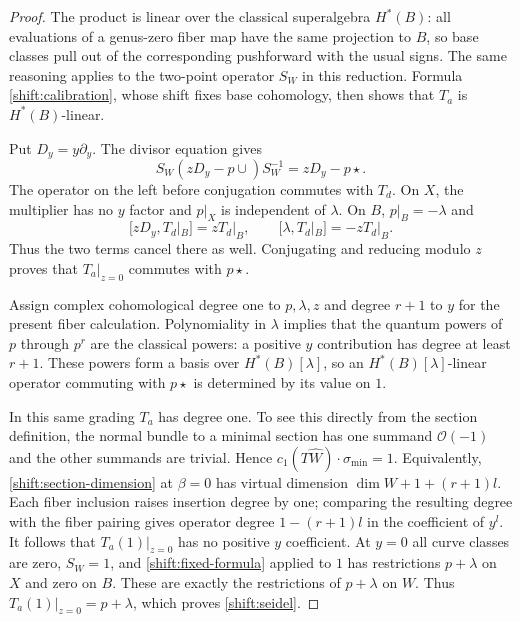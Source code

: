 \begin{proof}
The product is linear over the classical superalgebra $H^*(B)$:
all evaluations of a genus-zero fiber map have the same projection
to $B$, so base classes pull out of the corresponding pushforward
with the usual signs.  The same reasoning applies to the two-point
operator $S_W$ in this reduction.  Formula
\eqref{shift:calibration}, whose shift fixes base cohomology, then
shows that $T_a$ is $H^*(B)$-linear.

Put $D_y=y\partial_y$.  The divisor equation gives
\[
 S_W(zD_y-p\cup)S_W^{-1}=zD_y-p\star.
\]
The operator on the left before conjugation commutes with $T_d$.
On $X$, the multiplier has no $y$ factor and $p|_X$ is independent
of $\lambda$.  On $B$, $p|_B=-\lambda$ and
\[
 [zD_y,T_d|_B]=zT_d|_B,
 \qquad [\lambda,T_d|_B]=-zT_d|_B.
\]
Thus the two terms cancel there as well.  Conjugating and reducing
modulo $z$ proves that $T_a|_{z=0}$ commutes with $p\star$.

Assign complex cohomological degree one to $p,\lambda,z$ and
degree $r+1$ to $y$ for the present fiber calculation.  Polynomiality
in $\lambda$ implies that the quantum powers of $p$ through $p^r$
are the classical powers: a positive $y$ contribution has degree
at least $r+1$.  These powers form a basis over $H^*(B)[\lambda]$,
so an $H^*(B)[\lambda]$-linear operator commuting with $p\star$ is
determined by its value on $1$.

In this same grading $T_a$ has degree one.  To see this directly
from the section definition, the normal bundle to a minimal
section has one summand $\mathcal O(-1)$ and the other summands
are trivial.  Hence $c_1(T\widehat W)\cdot\sigma_{\min}=1$.
Equivalently, \eqref{shift:section-dimension} at $\beta=0$ has
virtual dimension $\dim W+1+(r+1)l$.  Each fiber inclusion raises
insertion degree by one; comparing the resulting degree with the
fiber pairing gives operator degree $1-(r+1)l$ in the coefficient
of $y^l$.  It follows that $T_a(1)|_{z=0}$ has no
positive $y$ coefficient.  At $y=0$ all curve classes are zero,
$S_W=1$, and \eqref{shift:fixed-formula} applied to $1$ has
restrictions $p+\lambda$ on $X$ and zero on $B$.  These are exactly
the restrictions of $p+\lambda$ on $W$.  Thus
$T_a(1)|_{z=0}=p+\lambda$, which proves \eqref{shift:seidel}.
\end{proof}

